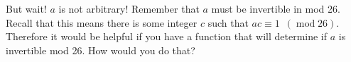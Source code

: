 But wait! $a$ is not arbitrary! Remember that $a$ must be invertible
in mod 26. Recall that this means there is some integer $c$ such
that $ac \equiv 1 \,\,\,(\operatorname{mod} 26)$. Therefore it would
be helpful if you have a function that will determine if $a$ is
invertible mod 26. How would you do that?

